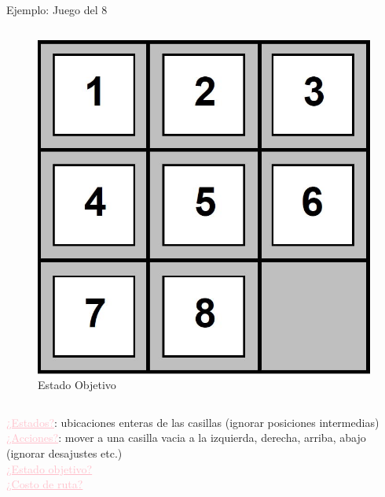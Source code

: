 \documentclass{beamer}
\theoremstyle{definition}
\theoremstyle{theorem}
\theoremstyle{remark}
\begin{document}
\begin{frame}{Ejemplo: Juego del 8}
\begin{columns}
		\begin{column}{0.5\textwidth}  %
			\begin{figure}
	     		\includegraphics[scale=.15]{21_grid2.JPG}
	     		\\
				\vspace{0pt}
				{\tiny Estado Objetivo}
			\end{figure}
		\end{column}
	\end{columns}
	\vfill
	\small{	
            \textcolor{Pink}{\underline{¿Estados?}}: ubicaciones enteras de las casillas (ignorar posiciones intermedias)\\
            \textcolor{Pink}{\underline{¿Acciones?}}: mover a una casilla vacia a la izquierda, derecha, arriba, abajo (ignorar desajustes etc.)\\
            \textcolor{Pink}{\underline{¿Estado objetivo?}}\\
            \textcolor{Pink}{\underline{¿Costo de ruta?}}\\
    }
\end{frame}
\end{document}
